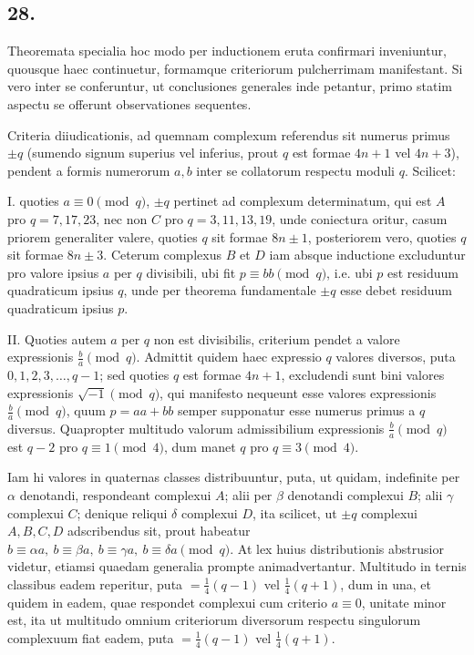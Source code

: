 \documentclass[12pt]{article}
\begin{document}
\subsection*{28.}

Theoremata specialia hoc modo per inductionem eruta confirmari inveniuntur, quousque haec continuetur, formamque criteriorum pulcherrimam manifestant. Si vero inter se conferuntur, ut conclusiones generales inde petantur, primo statim aspectu se offerunt observationes sequentes.

Criteria diiudicationis, ad quemnam complexum referendus sit numerus primus $\pm q$ (sumendo signum superius vel inferius, prout $q$ est formae $4n+1$ vel $4n+3$), pendent a formis numerorum $a,b$ inter se collatorum respectu moduli $q$. Scilicet:

I. quoties $a\equiv0\pmod q$, $\pm q$ pertinet ad complexum determinatum, qui est $A$ pro $q=7,17,23$, nec non $C$ pro $q=3,11,13,19$, unde coniectura oritur, casum priorem generaliter valere, quoties $q$ sit formae $8n\pm1$, posteriorem vero, quoties $q$ sit formae $8n\pm3$. Ceterum complexus $B$ et $D$ iam absque inductione excluduntur pro valore ipsius $a$ per $q$ divisibili, ubi fit $p\equiv bb\pmod q$, i.e. ubi $p$ est residuum quadraticum ipsius $q$, unde per theorema fundamentale $\pm q$ esse debet residuum quadraticum ipsius $p$.

II. Quoties autem $a$ per $q$ non est divisibilis, criterium pendet a valore expressionis $\frac{b}{a}\pmod q$. Admittit quidem haec expressio $q$ valores diversos, puta $0,1,2,3,\ldots,q-1$; sed quoties $q$ est formae $4n+1$, excludendi sunt bini valores expressionis $\sqrt{-1}\pmod q$, qui manifesto nequeunt esse valores expressionis $\frac{b}{a}\pmod q$, quum $p=aa+bb$ semper supponatur esse numerus primus a $q$ diversus. Quapropter multitudo valorum admissibilium expressionis $\frac{b}{a}\pmod q$ est $q-2$ pro $q\equiv1\pmod4$, dum manet $q$ pro $q\equiv3\pmod4$.

Iam hi valores in quaternas classes distribuuntur, puta, ut quidam, indefinite per $\alpha$ denotandi, respondeant complexui $A$; alii per $\beta$ denotandi complexui $B$; alii $\gamma$ complexui $C$; denique reliqui $\delta$ complexui $D$, ita scilicet, ut $\pm q$ complexui $A,B,C,D$ adscribendus sit, prout habeatur $b\equiv\alpha a,\ b\equiv\beta a,\ b\equiv\gamma a,\ b\equiv\delta a\pmod q$. At lex huius distributionis abstrusior videtur, etiamsi quaedam generalia prompte animadvertantur. Multitudo in ternis classibus eadem reperitur, puta $=\frac14(q-1)$ vel $\frac14(q+1)$, dum in una, et quidem in eadem, quae respondet complexui cum criterio $a\equiv0$, unitate minor est, ita ut multitudo omnium criteriorum diversorum respectu singulorum complexuum fiat eadem, puta $=\frac14(q-1)$ vel $\frac14(q+1)$.
\end{document}
